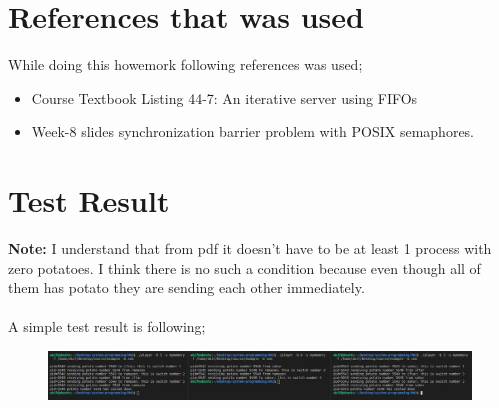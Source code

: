 \documentclass{article}
\begin{document}
\section{References that was used} 
While doing this howemork following references was used;
\begin{itemize}
	\item Course Textbook Listing 44-7: An iterative server using FIFOs
	\item Week-8 slides synchronization barrier problem with POSIX semaphores.
\end{itemize}
\section{Test Result}
\textbf{Note:} I understand that from pdf it doesn't have to be at least 1 process with zero potatoes. I think there is no such a condition because even though all of them has potato they are sending each other immediately. \\ \\
A simple test result is following;
\begin{figure}[H]
\includegraphics[width=1\textwidth, left]{result.JPG}
\caption[Optional caption]{}
\label{}
		
\end{figure}                              
\end{document}
